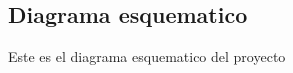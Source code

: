 \documentclass[../informe_krapp.tex]{subfiles}
\begin{document}
\graphicspath{{../images/}}
\subsection{Diagrama esquematico}
Este es el diagrama esquematico del proyecto
\end{document}
